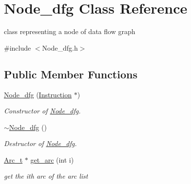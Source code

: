 \hypertarget{class_node__dfg}{}\section{Node\+\_\+dfg Class Reference}
\label{class_node__dfg}


class representing a node of data flow graph  




{\ttfamily \#include $<$Node\+\_\+dfg.\+h$>$}

\subsection*{Public Member Functions}
\begin{DoxyCompactItemize}
\item 
\mbox{\label{class_node__dfg_ac9b79961aaadf29eecd03b227b4c0875}} 
\mbox{\hyperlink{class_node__dfg_ac9b79961aaadf29eecd03b227b4c0875}{Node\+\_\+dfg}} (\mbox{\hyperlink{class_instruction}{Instruction}} $\ast$)
\begin{DoxyCompactList}\small\item\em Constructor of \mbox{\hyperlink{class_node__dfg}{Node\+\_\+dfg}}. \end{DoxyCompactList}\item 
\mbox{\label{class_node__dfg_a0a2a7c4634ad6802e7c69ab0d95957fa}} 
\mbox{\hyperlink{class_node__dfg_a0a2a7c4634ad6802e7c69ab0d95957fa}{$\sim$\+Node\+\_\+dfg}} ()
\begin{DoxyCompactList}\small\item\em Destructor of \mbox{\hyperlink{class_node__dfg}{Node\+\_\+dfg}}. \end{DoxyCompactList}\item 
\mbox{\label{class_node__dfg_adc4a8e37604e57eec03fecaaca094fb5}} 
\mbox{\hyperlink{struct_arc__t}{Arc\+\_\+t}} $\ast$ \mbox{\hyperlink{class_node__dfg_adc4a8e37604e57eec03fecaaca094fb5}{get\+\_\+arc}} (int i)
\begin{DoxyCompactList}\small\item\em get the ith arc of the arc list \end{DoxyCompactList}\item 
\mbox{\label{class_node__dfg_a27b393ab78abb865ef7c4e494de894da}} 

\end{DoxyCompactItemize}
